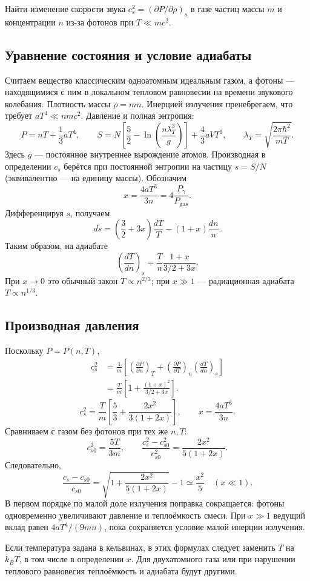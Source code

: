 \documentclass[../final.tex]{subfiles}
\begin{document}
\clearpage
{}
\condition
Найти изменение скорости звука
$c_s^2=(\partial P/\partial\rho)_s$ в газе частиц массы $m$
и концентрации $n$ из-за фотонов при $T\ll mc^2$.

\subsection*{Уравнение состояния и условие адиабаты}
Считаем вещество классическим одноатомным идеальным газом,
а фотоны --- находящимися с ним в локальном тепловом равновесии
на времени звукового колебания. Плотность массы
$\rho=mn$. Инерцией излучения пренебрегаем, что требует
$aT^4\ll nmc^2$. Давление и полная энтропия:
\[
 P=nT+\frac13aT^4,\qquad
 S=N\left[\frac52-\ln\left(\frac{n\lambda_T^3}{g}\right)\right]
 +\frac43aVT^3,\qquad
 \lambda_T=\sqrt{\frac{2\pi\hbar^2}{mT}}.
\]
Здесь $g$ --- постоянное внутреннее вырождение атомов.
Производная в определении $c_s$ берётся при постоянной энтропии
на частицу $s=S/N$ (эквивалентно --- на единицу массы).
Обозначим
\[
 x=\frac{4aT^3}{3n}=4\frac{P_\gamma}{P_{\mathrm{gas}}}.
\]
Дифференцируя $s$, получаем
\[
 ds=\left(\frac32+3x\right)\frac{dT}{T}
 -(1+x)\frac{dn}{n}.
\]
Таким образом, на адиабате
\[
 \left(\frac{dT}{dn}\right)_s
 =\frac{T}{n}\frac{1+x}{3/2+3x}.
\]
При $x\to0$ это обычный закон $T\propto n^{2/3}$;
при $x\gg1$ --- радиационная адиабата $T\propto n^{1/3}$.

\clearpage
\subsection*{Производная давления}
Поскольку $P=P(n,T)$,
\begin{align*}
 c_s^2&=\frac1m\left[
 \left(\frac{\partial P}{\partial n}\right)_T
 +\left(\frac{\partial P}{\partial T}\right)_n
 \left(\frac{dT}{dn}\right)_s\right]\\
 &=\frac{T}{m}\left[1+\frac{(1+x)^2}{3/2+3x}\right].
\end{align*}
\answer
\[
 \boxed{c_s^2=\frac{T}{m}\left[\frac53+
 \frac{2x^2}{3(1+2x)}\right]},\qquad x=\frac{4aT^3}{3n}.
\]
Сравниваем с газом без фотонов при тех же $n,T$:
\[
 c_{s0}^2=\frac{5T}{3m},\qquad
 \boxed{\frac{c_s^2-c_{s0}^2}{c_{s0}^2}
 =\frac{2x^2}{5(1+2x)}}.
\]
Следовательно,
\[
 \frac{c_s-c_{s0}}{c_{s0}}
 =\sqrt{1+\frac{2x^2}{5(1+2x)}}-1
 \simeq\frac{x^2}{5}\quad(x\ll1).
\]
В первом порядке по малой доле излучения поправка сокращается:
фотоны одновременно увеличивают давление и теплоёмкость смеси.
При $x\gg1$ ведущий вклад равен $4aT^4/(9mn)$,
пока сохраняется условие малой инерции излучения.

Если температура задана в кельвинах, в этих формулах следует
заменить $T$ на $k_BT$, в том числе в определении $x$.
Для двухатомного газа или при нарушении теплового равновесия
теплоёмкость и адиабата будут другими.
\end{document}
